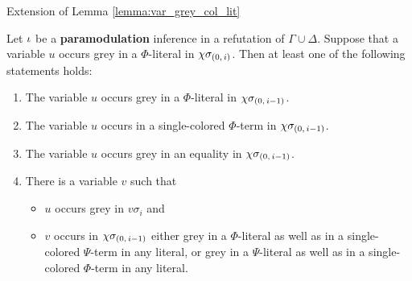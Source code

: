\documentclass[,%
	draft=false,%
	numbers=noendperiod
	12pt,
	a4paper,
	oneside,%
	openany,
]{memoir}
\newcommand{\inv}{\ensuremath{\chi}}
\begin{document}
Extension of Lemma \ref{lemma:var_grey_col_lit}

\begin{lemma}
	\label{lemma:var_grey_col_lit_paramod_star}
	Let $\iota$ be a \textbf{paramodulation} inference in a refutation of $\Gamma\cup\Delta$.
	Suppose that a variable $u$ occurs grey in a $\Phi$-literal in $\inv\sigmazi$.
	Then at least one of the following statements holds:
	\begin{enumerate}
		\item
			\label{16_1}
			The variable $u$ occurs grey in a $\Phi$-literal in $\inv\sigmazmi$.

		\item
			\label{16_5}
			The variable $u$ occurs in a single-colored $\Phi$-term in $\inv\sigmazmi$.

		\item
			\label{16_6}
			The variable $u$ occurs grey in an equality in $\inv\sigmazmi$.




		\item 
			\label{16_3}
			There is a variable $v$ such that
			{
				\renewcommand{\labelitemi}{\textendash}
				\begin{itemize}
					\item $u$ occurs grey in $v\sigma_i$ and
					\item
						$v$ occurs in $\inv\sigmazmi$
						either grey in a $\Phi$-literal as well as in a single-colored $\Psi$-term in any literal, 
						or grey in a $\Psi$-literal as well as in a single-colored $\Phi$-term in any literal.
				\end{itemize}
			}


	\end{enumerate}
\end{lemma}
\end{document}
